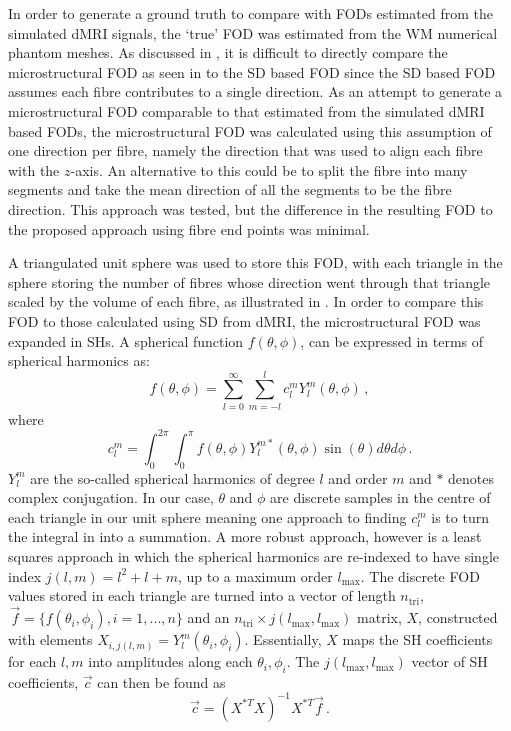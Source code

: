 In order to generate a ground truth to compare with \acp{FOD} estimated from the simulated \ac{dMRI} signals, the `true' \ac{FOD} was estimated from the \ac{WM} numerical phantom meshes.
As discussed in , it is difficult to directly compare the microstructural \ac{FOD} as seen in  to the \ac{SD} based \ac{FOD} since the \ac{SD} based \ac{FOD} assumes each fibre contributes to a single direction.
As an attempt to generate a microstructural \ac{FOD} comparable to that estimated from the simulated \ac{dMRI} based \acp{FOD}, the microstructural \ac{FOD} was calculated using this assumption of one direction per fibre, namely the direction that was used to align each fibre with the $z$-axis.
An alternative to this could be to split the fibre into many segments and take the mean direction of all the segments to be the fibre direction. This approach was tested, but the difference in the resulting \ac{FOD} to the proposed approach using fibre end points was minimal.

A triangulated unit sphere was used to store this \ac{FOD}, with each triangle in the sphere storing the number of fibres whose direction went through that triangle scaled by the volume of each fibre, as illustrated in .
In order to compare this \ac{FOD} to those calculated using \ac{SD} from \ac{dMRI}, the microstructural \ac{FOD} was expanded in \aclp{SH}. A spherical function $f(\theta, \phi)$, can be expressed in terms of spherical harmonics as:
\begin{equation}
  f(\theta, \phi) = \sum_{l=0}^{\infty} \sum_{m=-l}^{l} c_l^m Y_l^m(\theta, \phi)\,,
  \label{eq:frf_SH_expansion}
\end{equation}
where
\begin{equation}
  c_l^m = \int_0^{2\pi} \int_0^\pi f(\theta, \phi) Y_l^{m*}(\theta, \phi) \sin(\theta) d\theta d\phi\,.
  \label{eq:frf_SH_coeff}
\end{equation}
$Y_l^m$ are the so-called spherical harmonics of degree $l$ and order $m$ and $*$ denotes complex conjugation.
In our case, $\theta$ and $\phi$ are discrete samples in the centre of each triangle in our unit sphere meaning one approach to finding $c_l^m$ is to turn the integral in  into a summation. A more robust approach, however is a least squares approach \cite{Alexander2002,Brechbuhler1995} in which the spherical harmonics are re-indexed to have single index $j(l,m) = l^2 + l + m$, up to a maximum order $l_{\mathrm{max}}$.
The discrete \ac{FOD} values stored in each triangle are turned into a vector of length $n_{\mathrm{tri}}$, $\,\vec{f} = \{f(\theta_i, \phi_i), i=1,...,n\}$ and an $n_{\mathrm{tri}} \times j(l_{\mathrm{max}}, l_{\mathrm{max}})$ matrix, $X$, constructed with elements $X_{i, j(l,m)} = Y_l^m(\theta_i, \phi_i)$. Essentially, $X$ maps the SH coefficients for each $l,m$ into amplitudes along each $\theta_i, \phi_i$.
The $j(l_{\mathrm{max}}, l_{\mathrm{max}})$ vector of SH coefficients, $\vec{c}$ can then be found as
\begin{equation}
\vec{c} = (X^{*T}X)^{-1}X^{*T} \vec{f}\,.
\end{equation}

